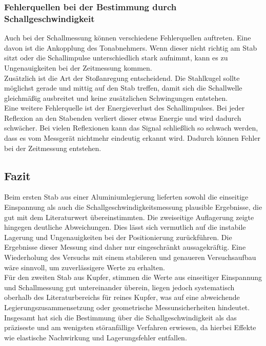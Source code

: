 \subsubsection{Fehlerquellen bei der Bestimmung durch Schallgeschwindigkeit}
Auch bei der Schallmessung können verschiedene Fehlerquellen auftreten. Eine davon ist die Ankopplung des Tonabnehmers. Wenn dieser nicht richtig am Stab sitzt oder die Schallimpulse unterschiedlich stark aufnimmt, kann es zu Ungenauigkeiten bei der Zeitmessung kommen.\\
Zusätzlich ist die Art der Stoßanregung entscheidend. Die Stahlkugel sollte möglichst gerade und mittig auf den Stab treffen, damit sich die Schallwelle gleichmäßig ausbreitet und keine zusätzlichen Schwingungen entstehen.\\
Eine weitere Fehlerquelle ist der Energieverlust des Schallimpulses. Bei jeder Reflexion an den Stabenden verliert dieser etwas Energie und wird dadurch schwächer. Bei vielen Reflexionen kann das Signal schließlich so schwach werden, dass es vom Messgerät nichtmehr eindeutig erkannt wird. Dadurch können Fehler bei der Zeitmessung entstehen.\\
\subsection{Fazit}
Beim ersten Stab aus einer Aluminiumlegierung lieferten sowohl die einseitige Einspannung als auch die Schallgeschwindigkeitsmessung plausible Ergebnisse, die gut mit dem Literaturwert übereinstimmten. Die zweiseitige Auflagerung zeigte hingegen deutliche Abweichungen. Dies lässt sich vermutlich auf die instabile Lagerung und Ungenauigkeiten bei der Positionierung zurückführen. Die Ergebnisse dieser Messung sind daher nur eingeschränkt aussagekräftig. Eine Wiederholung des Versuchs mit einem stabileren und genaueren Versuchsaufbau wäre sinnvoll, um zuverlässigere Werte zu erhalten.\\
Für den zweiten Stab aus Kupfer, stimmen die Werte aus einseitiger Einspannung und Schallmessung gut untereinander überein, liegen jedoch systematisch oberhalb des Literaturbereichs für reines Kupfer, was auf eine abweichende Legierungszusammensetzung oder geometrische Messunsicherheiten hindeutet. \\
Insgesamt hat sich die Bestimmung über die Schallgeschwindigkeit als das präziseste und am wenigsten störanfällige Verfahren erwiesen, da hierbei Effekte wie elastische Nachwirkung und Lagerungsfehler entfallen.